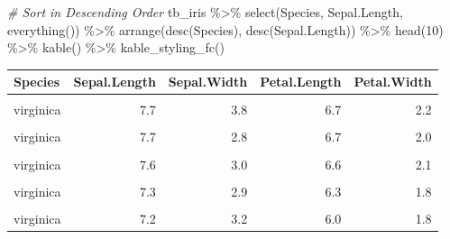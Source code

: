 \documentclass[
]{book}
\newenvironment{Shaded}{\begin{snugshade}}{\end{snugshade}}
\newcommand{\CommentTok}[1]{\textcolor[rgb]{0.56,0.35,0.01}{\textit{#1}}}
\newcommand{\DecValTok}[1]{\textcolor[rgb]{0.00,0.00,0.81}{#1}}
\newcommand{\FunctionTok}[1]{\textcolor[rgb]{0.00,0.00,0.00}{#1}}
\newcommand{\NormalTok}[1]{#1}
\newcommand{\SpecialCharTok}[1]{\textcolor[rgb]{0.00,0.00,0.00}{#1}}
\begin{document}
\begin{Shaded}
\begin{Highlighting}[]
\CommentTok{\# Sort in Descending Order}
\NormalTok{tb\_iris }\SpecialCharTok{\%\textgreater{}\%} \FunctionTok{select}\NormalTok{(Species, Sepal.Length, }\FunctionTok{everything}\NormalTok{()) }\SpecialCharTok{\%\textgreater{}\%}
  \FunctionTok{arrange}\NormalTok{(}\FunctionTok{desc}\NormalTok{(Species), }\FunctionTok{desc}\NormalTok{(Sepal.Length)) }\SpecialCharTok{\%\textgreater{}\%} \FunctionTok{head}\NormalTok{(}\DecValTok{10}\NormalTok{) }\SpecialCharTok{\%\textgreater{}\%}
  \FunctionTok{kable}\NormalTok{() }\SpecialCharTok{\%\textgreater{}\%} \FunctionTok{kable\_styling\_fc}\NormalTok{()}
\end{Highlighting}
\end{Shaded}

\begin{table}[!h]
\centering
\begin{tabular}{l|r|r|r|r}
\hline
Species & Sepal.Length & Sepal.Width & Petal.Length & Petal.Width\\
\hline
\cellcolor{gray!6}{virginica} & \cellcolor{gray!6}{7.9} & \cellcolor{gray!6}{3.8} & \cellcolor{gray!6}{6.4} & \cellcolor{gray!6}{2.0}\\
\hline
virginica & 7.7 & 3.8 & 6.7 & 2.2\\
\hline
\cellcolor{gray!6}{virginica} & \cellcolor{gray!6}{7.7} & \cellcolor{gray!6}{2.6} & \cellcolor{gray!6}{6.9} & \cellcolor{gray!6}{2.3}\\
\hline
virginica & 7.7 & 2.8 & 6.7 & 2.0\\
\hline
\cellcolor{gray!6}{virginica} & \cellcolor{gray!6}{7.7} & \cellcolor{gray!6}{3.0} & \cellcolor{gray!6}{6.1} & \cellcolor{gray!6}{2.3}\\
\hline
virginica & 7.6 & 3.0 & 6.6 & 2.1\\
\hline
\cellcolor{gray!6}{virginica} & \cellcolor{gray!6}{7.4} & \cellcolor{gray!6}{2.8} & \cellcolor{gray!6}{6.1} & \cellcolor{gray!6}{1.9}\\
\hline
virginica & 7.3 & 2.9 & 6.3 & 1.8\\
\hline
\cellcolor{gray!6}{virginica} & \cellcolor{gray!6}{7.2} & \cellcolor{gray!6}{3.6} & \cellcolor{gray!6}{6.1} & \cellcolor{gray!6}{2.5}\\
\hline
virginica & 7.2 & 3.2 & 6.0 & 1.8\\
\hline
\end{tabular}
\end{table}
\end{document}
